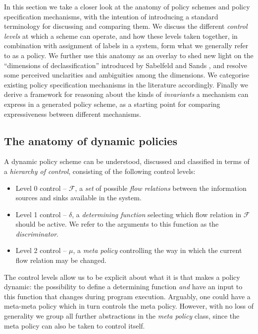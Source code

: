\label{sec:pollang}

In this section we take a closer look at the anatomy of policy schemes and policy specification mechanisms,
with the intention of introducing a standard terminology for discussing and comparing them.
We discuss the different \emph{control levels} at which a scheme can operate, and how
these levels taken together, in combination with assignment of labels in a system,
form what we generally refer to as a policy. 
We further use this anatomy as an
overlay to shed new light on the ``dimensions of declassification'' introduced by
Sabelfeld and Sands \cite{Sabelfeld:Sands:JCS}, and resolve some perceived unclarities and
ambiguities among the dimensions. We categorise existing policy specification mechanisms in 
the literature accordingly.
Finally we derive a framework for reasoning about the kinds of \emph{invariants} a
mechanism can express in a generated policy scheme, as a starting point for comparing 
expressiveness between different mechanisms. 



\subsection{The anatomy of dynamic policies}
\label{sec:pollang:anatomy}

\newcommand{\orderings}{\ensuremath{\mathcal{F}}}
\newcommand{\dynamicpol}{\ensuremath{\delta}}
\newcommand{\metapol}{\ensuremath{\mu}}


A dynamic policy scheme can be understood, discussed and classified in terms of a \emph{hierarchy of control}, 
consisting of the following control levels:
\begin{itemize}
  \item Level 0 control -- \orderings{}, a \emph{set} of possible \emph{flow relations} between the information
        sources and sinks available in the system.
  \item Level 1 control -- \dynamicpol{}, a \emph{determining function} selecting which flow relation in \orderings{} 
        should be active. We refer to the arguments to this function as the \emph{discriminator}.
\item Level 2 control -- \metapol{}, a \emph{meta policy} controlling the way in which the current flow relation 
        may be changed.\end{itemize}
The control levels allow us to be explicit about what it is that makes a policy dynamic: 
the possibility to define a determining function \emph{and} have an input to this function
that changes during program execution.
Arguably, one could have a meta-meta policy which in turn controls the meta policy.
However, with no loss of generality we group all further abstractions in the 
\emph{meta policy} class, since the meta policy can also be taken to control itself.


